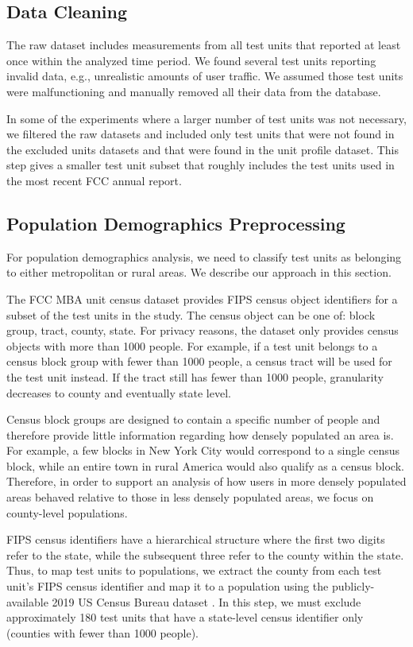 \documentclass[conference,10pt]{IEEEtran}
\begin{document}
\subsection{Data Cleaning}

The raw dataset includes measurements from all test units that reported at least once within the analyzed time period. We found several test units reporting invalid data, e.g., unrealistic amounts of user traffic. We assumed those test units were malfunctioning and manually removed all their data from the database.

In some of the experiments where a larger number of test units was not necessary, we filtered the raw datasets and included only test units that were not found in the excluded units datasets and that were found in the unit profile dataset. This step gives a smaller test unit subset that roughly includes the test units used in the most recent \gls{FCC} annual report.

\subsection{Population Demographics Preprocessing}

For population demographics analysis, we need to classify test units as belonging to either metropolitan or rural areas. We describe our approach in this section.

The \gls{FCC} \gls{MBA} unit census dataset provides \gls{FIPS} census object identifiers for a subset of the test units in the study. The census object can be one of: block group, tract, county, state. For privacy reasons, the dataset only provides census objects with more than 1000 people. For example, if a test unit belongs to a census block group with fewer than 1000 people, a census tract will be used for the test unit instead. If the tract still has fewer than 1000 people, granularity decreases to county and eventually state level.

Census block groups are designed to contain a specific number of people and therefore provide little information regarding how densely populated an area is. For example, a few blocks in New York City would correspond to a single census block, while an entire town in rural America would also qualify as a census block. Therefore, in order to support an analysis of how users in more densely populated areas behaved relative to those in less densely populated areas, we focus on county-level populations.

\gls{FIPS} census identifiers have a hierarchical structure where the first two digits refer to the state, while the subsequent three refer to the county within the state. Thus, to map test units to populations, we extract the county from each test unit's \gls{FIPS} census identifier and map it to a population using the publicly-available 2019 \gls{US} Census Bureau dataset \cite{census}. In this step, we must exclude approximately 180 test units that have a state-level census identifier only (counties with fewer than 1000 people).
\end{document}
